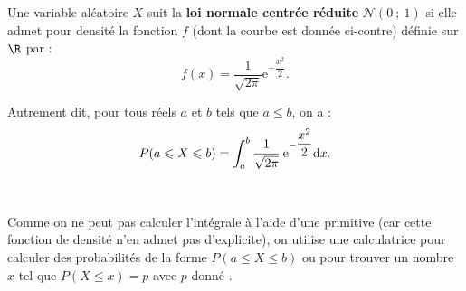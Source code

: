 \documentclass{cornouaille}
\begin{document}
\begin{definition}

\begin{minipage}{0.6\linewidth}
  Une variable aléatoire $X$ suit la \textbf{loi normale
    centrée \mbox{réduite}}
  $\mathcal{N}(0\ ;\ 1)$ si elle admet pour densité la fonction $f$
  (dont la courbe est donnée ci-contre) définie sur $\R$ par :
  $$f(x)=\dfrac{1}{\sqrt{2\pi}}\textrm{e}^{-\dfrac{x^2}{2}}.$$
\end{minipage}
\hfill
\begin{minipage}{0.4\linewidth}
\begin{center}
\end{center}
\end{minipage}

Autrement dit, pour tous réels $a$ et $b$ tels que $a\leqslant b$, on a :
\vspace{-0.5\baselineskip}$$P(a\leqslant X\leqslant b)=\displaystyle
\int_a^b \cfrac{1}{\sqrt{2\pi}}\text{ e}^{-\dfrac{x^2}{2}}\textrm{d} x.$$

~~
\end{definition}



\begin{remarque}
Comme on ne peut pas calculer l'intégrale à l'aide d'une primitive
(car cette fonction de densité n'en admet pas d'explicite), on utilise
une calculatrice pour calculer des probabilités de la forme
$P(a\leqslant X\leqslant b)$ ou pour trouver un nombre $x$ tel que
$P(X\leqslant x)=p$ avec $p$ donné .
\end{remarque}
\end{document}
